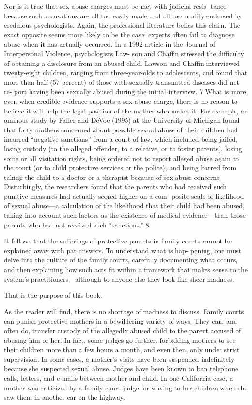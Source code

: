 Nor is it true that sex abuse charges must be met with judicial resis-
tance because such accusations are all too easily made and all too readily
endorsed by credulous psychologists. Again, the professional literature
belies this claim. The exact opposite seems more likely to be the case:
experts often fail to diagnose abuse when it has actually occurred. In a
1992 article in the Journal of Interpersonal Violence, psychologists Law-
son and Chaffin stressed the difficulty of obtaining a disclosure from an
abused child. Lawson and Chaffin interviewed twenty-eight children,
ranging from three-year-olds to adolescents, and found that more than
half (57 percent) of those with sexually transmitted diseases did not re-
port having been sexually abused during the initial interview. 7 What is
more, even when credible evidence supports a sex abuse charge, there
is no reason to believe it will help the legal position of the mother who
makes it. For example, an ominous study by Faller and DeVoe (1995) at
the University of Michigan found that forty mothers concerned about
possible sexual abuse of their children had incurred “negative sanctions”
from a court of law, which included being jailed, losing custody (to the
alleged offender, to a relative, or to foster parents), losing some or all
visitation rights, being ordered not to report alleged abuse again to the
court (or to child protective services or the police), and being barred
from taking the child to a doctor or a therapist because of sex abuse
concerns. Disturbingly, the researchers found that the parents who had
received such punitive measures had actually scored higher on a com-
posite scale of likelihood of sexual abuse—a calculation of the likelihood
that their child had been abused, taking into account such factors as the
existence of medical evidence—than those parents who had not received
such “sanctions.” 8 \pfl{}


It follows that the sufferings of protective parents in family courts
cannot be explained away with pat answers. To understand what is hap-
pening, one must delve into the culture of the family courts, carefully
documenting what occurs, and then explaining how such acts fit within
a framework that makes sense to the system’s practitioners—although
to anyone else they look like sheer madness. \pfl{}


That is the purpose of this book. \pfl{}


As the reader will find, there is no shortage of madness to discuss.
Family courts can punish protective mothers in a bewildering variety of
ways. They can, and often do, transfer custody of the allegedly abused
child to the parent accused of abusing him or her. In fact, some judges go
further, forbidding mothers to see their children more than a few hours
a month, and even then, only under strict supervision. In some cases, a
mother’s visits have been suspended indefinitely because she suspected
sexual abuse. Judges have been known to ban telephone calls, letters,
and e-mails between mother and child. In one California case, a mother
was criticized by a family court judge for waving to her children when
she saw them in another car on the highway. \pfl{}


